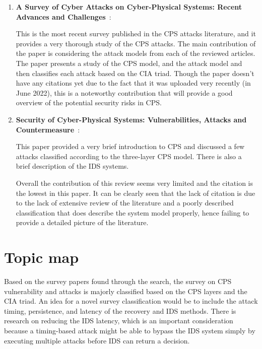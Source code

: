 \documentclass[12pt]{article}
\begin{document}
\begin{enumerate}
\item

\textbf{A Survey of Cyber Attacks on Cyber-Physical
Systems: Recent Advances and Challenges}~\cite{9763485}:

This is the most recent survey published in the CPS attacks literature, and it provides a very thorough study of the CPS attacks. The main contribution of the paper is considering the attack models from each of the reviewed articles. The paper presents a study of the CPS model, and the attack model and then classifies each attack based on the CIA triad. Though the paper doesn't have any citations yet due to the fact that it was uploaded very recently (in June 2022), this is a noteworthy contribution that will provide a good overview of the potential security risks in CPS.


\item
\textbf{Security of Cyber-Physical Systems: Vulnerabilities,
Attacks and Countermeasure}~\cite{9216454}:

This paper provided a very brief introduction to CPS and discussed a few attacks classified according to the three-layer CPS model. There is also a brief description of the IDS systems.

Overall the contribution of this review seems very limited and the citation is the lowest in this paper. It can be clearly seen that the lack of citation is due to the lack of extensive review of the literature and a poorly described classification that does describe the system model properly, hence failing to provide a detailed picture of the literature.
\end{enumerate}

\section*{Topic map}
Based on the survey papers found through the search, the survey on CPS vulnerability and attacks is majorly classified based on the CPS layers and the CIA triad. An idea for a novel survey classification would be to include the attack timing, persistence, and latency of the recovery and IDS methods. There is research on reducing the IDS latency, which is an important consideration because a timing-based attack might be able to bypass the IDS system simply by executing multiple attacks before IDS can return a decision.



\end{document}
